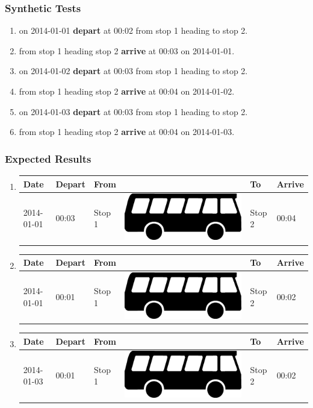 \documentclass[a4paper,11pt]{article}
\newcommand*{\bus}{\includegraphics[scale=0.02]{img/bus}}
\begin{document}
\begin{enumerate}
\subsubsection*{Synthetic Tests}
\begin{enumerate}
\item on 2014-01-01 \textbf{depart} at 00:02 from stop 1 heading to stop 2.
\item from stop 1 heading stop 2 \textbf{arrive} at 00:03 on 2014-01-01.

\item on 2014-01-02 \textbf{depart} at 00:03 from stop 1 heading to stop 2.
\item from stop 1 heading stop 2 \textbf{arrive} at 00:04 on 2014-01-02.

\item on 2014-01-03 \textbf{depart} at 00:03 from stop 1 heading to stop 2.
\item from stop 1 heading stop 2 \textbf{arrive} at 00:04 on 2014-01-03.
\end{enumerate}


\subsubsection*{Expected Results}
\begin{enumerate}
\item
{\scriptsize
\begin{tabular}{p{1.4cm} | p{.75cm} | p{2.1cm} c p{2.1cm} | p{.75cm} }
\hline
\rowcolor{Gray}
Date & Depart & From & & To & Arrive \\
\hline
2014-01-01 & 00:03 & Stop 1 & \bus & Stop 2 & 00:04 \\
\hline
\end{tabular}
}

\item
{\scriptsize
\begin{tabular}{p{1.4cm} | p{.75cm} | p{2.1cm} c p{2.1cm} | p{.75cm} }
\hline
\rowcolor{Gray}
Date & Depart & From & & To & Arrive \\
\hline
2014-01-01 & 00:01 & Stop 1 & \bus & Stop 2 & 00:02 \\
\hline
\end{tabular}
}

\item
{\scriptsize
\begin{tabular}{p{1.4cm} | p{.75cm} | p{2.1cm} c p{2.1cm} | p{.75cm} }
\hline
\rowcolor{Gray}
Date & Depart & From & & To & Arrive \\
\hline
2014-01-03 & 00:01 & Stop 1 & \bus & Stop 2 & 00:02 \\
\hline
\end{tabular}
}


\end{enumerate}
\end{enumerate}
\end{document}
